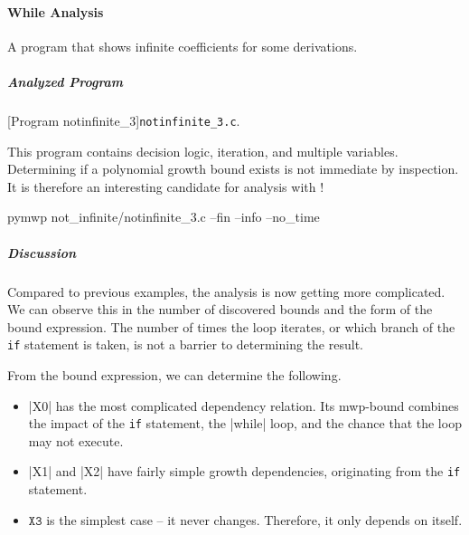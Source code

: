 \paragraph{While Analysis}\label{while-analysis}
A program that shows infinite coefficients for some derivations.

\subparagraph*{Analyzed Program}

\begin{center}
\begin{minipage}{\textwidth}
\captionsetup{type=lstlisting}
[Program notinfinite\_3]{\texttt{notinfinite\_3.c}.}
\label{lst:notinfinite3}
\end{minipage}
\end{center}

This program contains decision logic, iteration, and multiple variables.
Determining if a polynomial growth bound exists is not immediate by inspection.
It is therefore an interesting candidate for analysis with !

\begin{center}
\begin{minipage}{\textwidth}
\captionsetup{type=lstlisting}
\begin{cmdlisting}[label={lst:ex3-run-cmd}]
pymwp not_infinite/notinfinite_3.c --fin --info --no_time
\end{cmdlisting}
\end{minipage}
\end{center}

\begin{center}
\begin{minipage}{\textwidth}
\end{minipage}
\label{lst:ex3-output}
\end{center}

\subparagraph*{Discussion}\label{discussion}

Compared to previous examples, the analysis is now getting more complicated. We
can observe this in the number of discovered bounds and the form of the bound
expression. The number of times the loop iterates, or which branch of the
\texttt{if} statement is taken, is not a barrier to determining the result.

From the bound expression, we can determine the following.

\begin{itemize}
\item \pr|X0| has the most complicated dependency relation. Its
mwp-bound combines the impact of the \texttt{if} statement, the
\pr|while| loop, and the chance that the loop may not execute.

\item \pr|X1| and \pr|X2| have fairly simple growth dependencies, originating
from the \texttt{if} statement.

\item \(\texttt{X3}\) is the simplest case -- it never changes. Therefore, it
only depends on itself.
\end{itemize}

